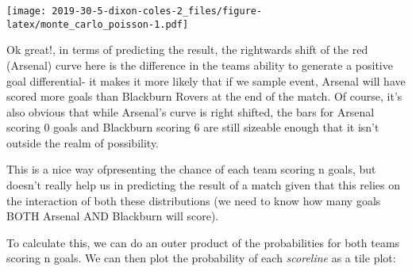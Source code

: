 \documentclass[
]{article}
\newenvironment{Shaded}{\begin{snugshade}}{\end{snugshade}}
\newcommand{\CommentTok}[1]{\textcolor[rgb]{0.56,0.35,0.01}{\textit{#1}}}
\newcommand{\DataTypeTok}[1]{\textcolor[rgb]{0.13,0.29,0.53}{#1}}
\newcommand{\DecValTok}[1]{\textcolor[rgb]{0.00,0.00,0.81}{#1}}
\newcommand{\KeywordTok}[1]{\textcolor[rgb]{0.13,0.29,0.53}{\textbf{#1}}}
\newcommand{\NormalTok}[1]{#1}
\newcommand{\OperatorTok}[1]{\textcolor[rgb]{0.81,0.36,0.00}{\textbf{#1}}}
\newcommand{\OtherTok}[1]{\textcolor[rgb]{0.56,0.35,0.01}{#1}}
\newcommand{\StringTok}[1]{\textcolor[rgb]{0.31,0.60,0.02}{#1}}
\begin{document}
\texttt{[image: 2019-30-5-dixon-coles-2\_files/figure-latex/monte\_carlo\_poisson-1.pdf]}

Ok great!, in terms of predicting the result, the rightwards shift of
the red (Arsenal) curve here is the difference in the teams ability to
generate a positive goal differential- it makes it more likely that if
we sample event, Arsenal will have scored more goals than Blackburn
Rovers at the end of the match. Of course, it's also obvious that while
Arsenal's curve is right shifted, the bars for Arsenal scoring 0 goals
and Blackburn scoring 6 are still sizeable enough that it isn't outside
the realm of possibility.

This is a nice way ofpresenting the chance of each team scoring n goals,
but doesn't really help us in predicting the result of a match given
that this relies on the interaction of both these distributions (we need
to know how many goals BOTH Arsenal AND Blackburn will score).

To calculate this, we can do an outer product of the probabilities for
both teams scoring n goals. We can then plot the probability of each
\emph{scoreline} as a tile plot:

\begin{Shaded}
\end{Shaded}
\end{document}

